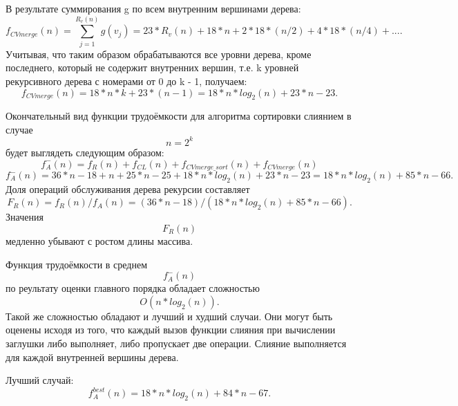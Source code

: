 \documentclass[12pt,a4paper]{scrartcl}
\begin{document}
В результате суммирования g по всем внутренним вершинами дерева:
\begin{equation}\label{eq2.17}
f_{CV merge}(n) = \sum \limits_{j=1}^{R_v(n)} g(v_j) = 23*R_v(n) + 18*n + 2*18*(n/2) + 4*18*(n/4) + ... .
\end{equation}
Учитывая, что таким образом обрабатываются все уровни дерева, кроме последнего, который не содержит внутренних вершин, т.е. k уровней рекурсивного дерева с номерами от 0 до k - 1, получаем:
\begin{equation}\label{eq2.18}
f_{CV merge}(n) = 18*n*k + 23*(n - 1) = 18*n*log_2(n) + 23*n - 23.
\end{equation}

Окончательный вид функции трудоёмкости для алгоритма сортировки слиянием в случае 
\begin{equation*}
n = 2^k
\end{equation*}
будет выглядеть следующим образом:
\begin{equation}\label{eq2.18}
f_A^-(n) = f_R(n) + f_{CL}(n) + f_{CV merge\_sort}(n) + f_{CV merge}(n)
\end{equation}
\begin{equation}\label{eq2.19}
f_A^-(n) = 36*n - 18 + n + 25*n - 25 + 18*n*log_2(n) + 23*n - 23 = 18*n*log_2(n) + 85*n - 66.
\end{equation}
Доля операций обслуживания дерева рекурсии составляет
\begin{equation}\label{eq2.20}
F_R(n) = f_R(n) / f_A(n) = (36*n - 18) / (18*n*log_2(n) + 85*n - 66).
\end{equation}
Значения 
\begin{equation*} 
F_R(n) 
\end{equation*} 
медленно убывают с ростом длины массива.

Функция трудоёмкости в среднем 
\begin{equation*}
f_A^-(n)
\end{equation*}
по реультату оценки главного порядка обладает сложностью 
\begin{equation}\label{eq2.21}
O(n*log_2(n)).
\end{equation}
Такой же сложностью обладают и лучший и худший случаи. Они могут быть оценены исходя из того, что каждый вызов функции слияния при вычислении заглушки либо выполняет, либо пропускает две операции. Слияние выполняется для каждой внутренней вершины дерева.

Лучший случай:
\begin{equation}\label{eq2.22}
f_A^{best}(n) =  18*n*log_2(n) + 84*n - 67.
\end{equation}
\end{document}
